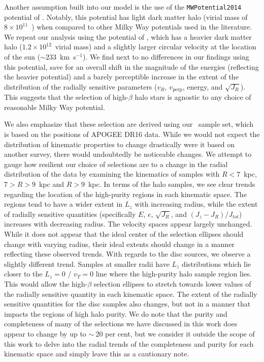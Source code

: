 Another assumption built into our model is the use of the \texttt{MWPotential2014} potential of \textcite{bovy14}. Notably, this potential has light dark matter halo (virial mass of $8\times10^{11}$~\Msun) when compared to other Milky Way potentials used in the literature. We repeat our analysis using the potential of \textcite{mcmillan17}, which has a heavier dark matter halo ($1.2\times10^{12}$~\Msun virial mass) and a slightly larger circular velocity at the location of the sun ($\sim 233$~km~s$^{-1}$). We find next to no differences in our findings using this potential, save for an overall shift in the magnitude of the energies (reflecting the heavier potential) and a barely perceptible increase in the extent of the distribution of the radially sensitive parameters ($v_{R}$, $v_{\mathrm{perp}}$, energy, and $\sqrt{J_{R}}$). This suggests that the selection of high-$\beta$ halo stars is agnostic to any choice of reasonable Milky Way potential.

We also emphasize that these selection are derived using our \survey\ sample set, which is based on the positions of APOGEE DR16 data. While we would not expect the distribution of kinematic properties to change drastically were it based on another survey, there would undoubtedly be noticeable changes. We attempt to gauge how resilient our choice of selections are to a change in the radial distribution of the data by examining the kinematics of samples with $R<7$~kpc,  $7>R>9$~kpc and $R>9$~kpc. In terms of the halo samples, we see clear trends regarding the location of the high-purity regions in each kinematic space. The regions tend to have a wider extent in $L_{z}$ with increasing radius, while the extent of radially sensitive quantities (specifically $E$, $e$, $\sqrt{J_{R}}$, and $(J_{z}-J_{R})/J_{tot}$) increases with decreasing radius. The velocity spaces appear largely unchanged. While it does not appear that the ideal center of the selection ellipses should change with varying radius, their ideal extents should change in a manner reflecting these observed trends. With regards to the disc sources, we observe a slightly different trend. Samples at smaller radii have $L_{z}$ distributions which lie closer to the $L_{z}=0$ / $v_{T}=0$ line where the high-purity halo sample region lies. This would allow the high-$\beta$ selection ellipses to stretch towards lower values of the radially sensitive quantity in each kinematic space. The extent of the radially sensitive quantities for the disc samples also changes, but not in a manner that impacts the regions of high halo purity. We do note that the purity and completeness of many of the selections we have discussed in this work does appear to change by up to $\sim~20$ per cent, but we consider it outside the scope of this work to delve into the radial trends of the completeness and purity for each kinematic space and simply leave this as a cautionary note.

